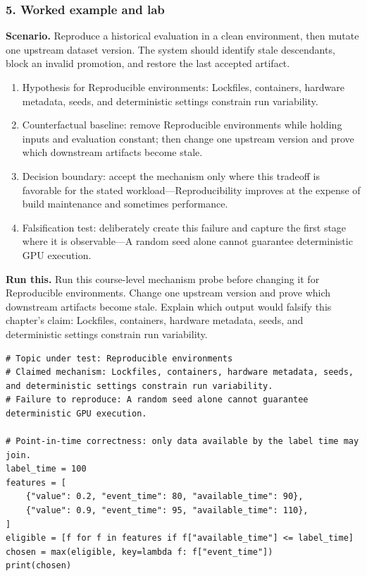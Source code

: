\subsubsection*{5. Worked example and lab}
\textbf{Scenario.} Reproduce a historical evaluation in a clean environment, then mutate one upstream dataset version. The system should identify stale descendants, block an invalid promotion, and restore the last accepted artifact.
\begin{enumerate}
\item Hypothesis for Reproducible environments: Lockfiles, containers, hardware metadata, seeds, and deterministic settings constrain run variability.
\item Counterfactual baseline: remove Reproducible environments while holding inputs and evaluation constant; then change one upstream version and prove which downstream artifacts become stale.
\item Decision boundary: accept the mechanism only where this tradeoff is favorable for the stated workload—Reproducibility improves at the expense of build maintenance and sometimes performance.
\item Falsification test: deliberately create this failure and capture the first stage where it is observable—A random seed alone cannot guarantee deterministic GPU execution.
\end{enumerate}
\textbf{Run this.} Run this course-level mechanism probe before changing it for Reproducible environments. Change one upstream version and prove which downstream artifacts become stale. Explain which output would falsify this chapter's claim: Lockfiles, containers, hardware metadata, seeds, and deterministic settings constrain run variability.
\begin{Verbatim}[fontsize=\scriptsize]
# Topic under test: Reproducible environments
# Claimed mechanism: Lockfiles, containers, hardware metadata, seeds, and deterministic settings constrain run variability.
# Failure to reproduce: A random seed alone cannot guarantee deterministic GPU execution.

# Point-in-time correctness: only data available by the label time may join.
label_time = 100
features = [
    {"value": 0.2, "event_time": 80, "available_time": 90},
    {"value": 0.9, "event_time": 95, "available_time": 110},
]
eligible = [f for f in features if f["available_time"] <= label_time]
chosen = max(eligible, key=lambda f: f["event_time"])
print(chosen)
\end{Verbatim}
